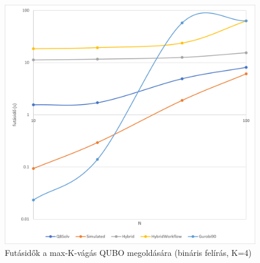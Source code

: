 \begin{figure}[!ht]
	\centering
	\includegraphics[width=150mm, keepaspectratio]{figures/diagrams/maxKCutQUBO_K4_bin.png}
	\caption{Futásidők a max-K-vágás QUBO megoldására (bináris felírás, K=4)}
	\label{fig:maxKCutQUBO_K4_bin}
\end{figure}